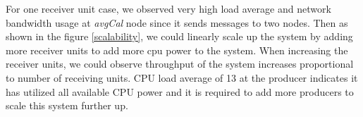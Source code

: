 For one receiver unit case, we observed very high load average and network bandwidth usage at \textit{avgCal} node since it sends messages to two nodes. Then as shown in the figure \ref{scalability}, we could linearly scale up the system by adding more receiver units to add more cpu power to the system. When increasing the receiver units, we could observe throughput of the system increases proportional to number of receiving units. CPU load average of 13 at the producer indicates it has utilized all available CPU power and it is required to add more producers to scale this system further up. 


